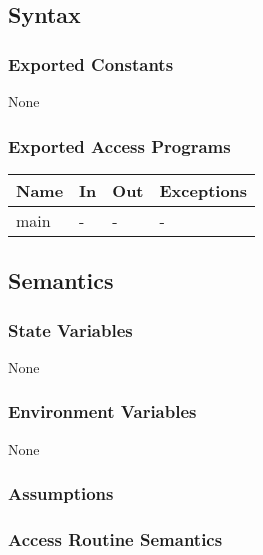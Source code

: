 \documentclass[12pt, titlepage]{article}
\begin{document}
\subsection{Syntax}

\subsubsection{Exported Constants}
None
\subsubsection{Exported Access Programs}

\begin{center}
\begin{tabular}{p{2cm} p{4cm} p{4cm} p{2cm}}
\hline
\textbf{Name} & \textbf{In} & \textbf{Out} & \textbf{Exceptions} \\
\hline
main & - & - & - \\
\hline
\end{tabular}
\end{center}

\subsection{Semantics}
\subsubsection{State Variables}
None

\subsubsection{Environment Variables}
None

\subsubsection{Assumptions}


\subsubsection{Access Routine Semantics}
\end{document}
